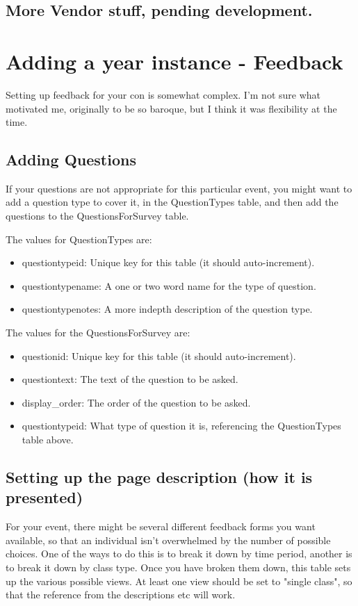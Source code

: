 \documentclass[captions=tablesignature]{scrartcl}
\begin{document}
\subsection{More Vendor stuff, pending development.}
\label{sec-14-2}

\section{Adding a year instance - Feedback}
\label{sec-15}
Setting up feedback for your con is somewhat complex.  I'm not sure
what motivated me, originally to be so baroque, but I think it was
flexibility at the time.
\subsection{Adding Questions}
\label{sec-15-1}
If your questions are not appropriate for this particular event,
you might want to add a question type to cover it, in the
QuestionTypes table, and then add the questions to the
QuestionsForSurvey table.

The values for QuestionTypes are:
\begin{itemize}
\item questiontypeid: Unique key for this table (it should auto-increment).
\item questiontypename: A one or two word name for the type of question.
\item questiontypenotes: A more indepth description of the question type.
\end{itemize}

The values for the QuestionsForSurvey are:
\begin{itemize}
\item questionid: Unique key for this table (it should auto-increment).
\item questiontext: The text of the question to be asked.
\item display\_order: The order of the question to be asked.
\item questiontypeid: What type of question it is, referencing the
QuestionTypes table above.
\end{itemize}

\subsection{Setting up the page description (how it is presented)}
\label{sec-15-2}
For your event, there might be several different feedback forms you
want available, so that an individual isn't overwhelmed by the
number of possible choices.  One of the ways to do this is to break
it down by time period, another is to break it down by class type.
Once you have broken them down, this table sets up the various
possible views.  At least one view should be set to "single class",
so that the reference from the descriptions etc will work.
\end{document}
